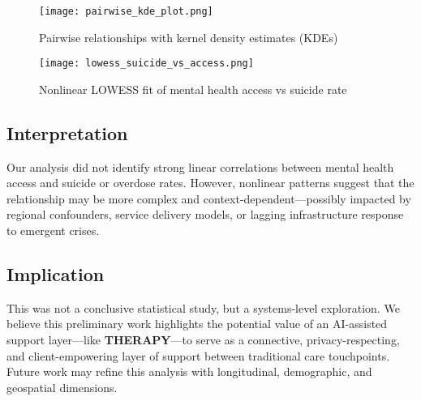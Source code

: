 \begin{figure}[H]
  \centering
  \texttt{[image: pairwise\_kde\_plot.png]}
  \caption{Pairwise relationships with kernel density estimates (KDEs)}
\end{figure}

\begin{figure}[H]
  \centering
  \texttt{[image: lowess\_suicide\_vs\_access.png]}
  \caption{Nonlinear LOWESS fit of mental health access vs suicide rate}
\end{figure}

\subsection*{Interpretation}

Our analysis did not identify strong linear correlations between mental health access and suicide or overdose rates. However, nonlinear patterns suggest that the relationship may be more complex and context-dependent—possibly impacted by regional confounders, service delivery models, or lagging infrastructure response to emergent crises.

\subsection*{Implication}

This was not a conclusive statistical study, but a systems-level exploration. We believe this preliminary work highlights the potential value of an AI-assisted support layer—like \textbf{THERAPY}—to serve as a connective, privacy-respecting, and client-empowering layer of support between traditional care touchpoints. Future work may refine this analysis with longitudinal, demographic, and geospatial dimensions.

